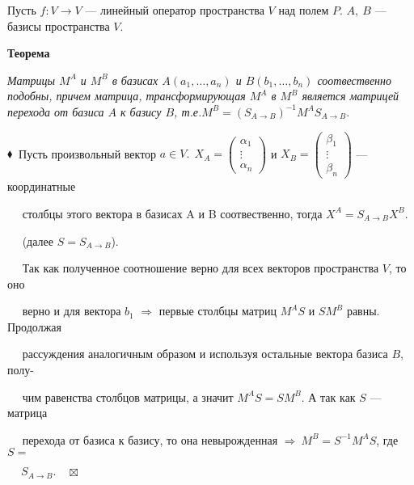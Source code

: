 \documentclass[a4paper, 12pt]{report}
\begin{document}
	Пусть $f: V \rightarrow V$ --- линейный оператор пространства $V$ над полем $P$.
	$A,\  B$ --- базисы пространства $V$.
	\par\bigskip
	
	\textbf{Теорема}
	
	
	\textit{Матрицы $M^A$ и $M^B$ в базисах $A(a_1, \dots, a_n)$ и $B(b_1, \dots, b_n)$ соотвественно подобны, причем матрица, трансформирующая  $M^A$ в $M^B$ является матрицей перехода от базиса $A$ к базису $B$, т.е.$M^B = (S_{A\rightarrow B})^{-1}M^AS_{A\rightarrow B}.$}
	
	$\blacklozenge\ $ Пусть произвольный вектор $a \in V. \ \ X_A = \begin{pmatrix} \alpha_1 \\ \vdots \\ \alpha_n \end{pmatrix}$ и $X_B = \begin{pmatrix} \beta_1 \\ \vdots \\ \beta_n \end{pmatrix}$ --- координатные 
	
	$\quad$ столбцы этого вектора в базисах A и B соотвественно, тогда $X^A = S_{A\rightarrow B} X^B.$ 
	
	$\quad$ (далее $S = S_{A\rightarrow B}$).
	
	$\quad$ Так как полученное соотношение верно для всех векторов пространства $V$, то оно 
	
	$\quad$ верно и для вектора $b_1$ $\Rightarrow$ первые столбцы матриц $M^A S$ и $SM^B$ равны. Продолжая 
	
	$\quad$ рассуждения аналогичным образом и используя остальные вектора базиса $B$, полу-
	
	$\quad$ чим равенства столбцов матрицы, а значит $M^A S = SM^B$. А так как $S$ --- матрица 
	
	$\quad$ перехода от базиса к базису, то она невырожденная  $\Rightarrow \ M^B = S^{-1}M^A S$, где $S = $
	
	$\quad \ S_{A\rightarrow B}. \quad \boxtimes$
	
	
	
	
	
	
	
	
	
	
	
	
\end{document}
